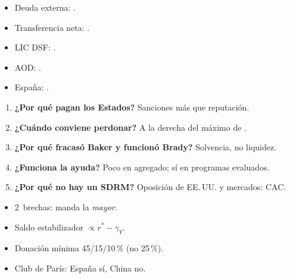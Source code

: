 \documentclass{article}
\begin{document}
\begin{columnas}
\anexorepaso
{}
\begin{itemize}
\item Deuda externa: .
\item Transferencia neta: .
\item LIC DSF: .
\item AOD: .
\item España: .
\end{itemize}
\begin{enumerate}
\item \textbf{¿Por qué pagan los Estados?} Sanciones más que reputación.
\item \textbf{¿Cuándo conviene perdonar?} A la derecha del máximo de .
\item \textbf{¿Por qué fracasó Baker y funcionó Brady?} Solvencia, no liquidez.
\item \textbf{¿Funciona la ayuda?} Poco en agregado; sí en programas evaluados.
\item \textbf{¿Por qué no hay un SDRM?} Oposición de EE.\,UU. y mercados: CAC.
\end{enumerate}
\begin{trampa}
\begin{itemize}
\item 2~brechas: manda la \emph{mayor}.
\item Saldo estabilizador $\propto r^*-\gamma_Y$.
\item Donación mínima 45/15/10\,\% (no 25\,\%).
\item Club de París: España sí, China no.
\end{itemize}
\end{trampa}

\end{columnas}
\end{document}
